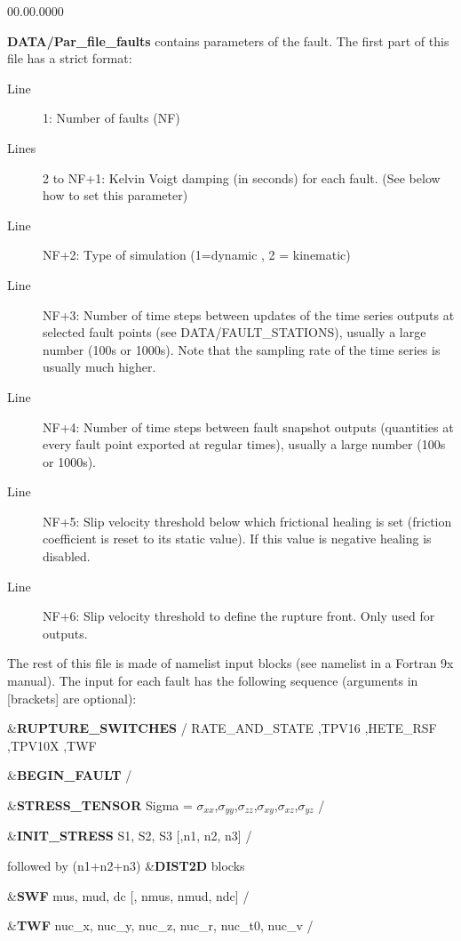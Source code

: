 \begin{lyxlist}{00.00.0000}
\item [{\textbf{DATA/Par\_file\_faults}}] contains parameters of the fault.
The first part of this file has a strict format:

\begin{description}
\item [{Line}] 1: Number of faults (NF)
\item [{Lines}] 2 to NF+1: Kelvin Voigt damping (in seconds) for each fault.
(See below how to set this parameter)
\item [{Line}] NF+2: Type of simulation (1=dynamic , 2 = kinematic)
\item [{Line}] NF+3: Number of time steps between updates of the time series
outputs at selected fault points (see DATA/FAULT\_STATIONS), usually
a large number (100s or 1000s). Note that the sampling rate of the
time series is usually much higher.
\item [{Line}] NF+4: Number of time steps between fault snapshot outputs
(quantities at every fault point exported at regular times), usually
a large number (100s or 1000s).
\item [{Line}] NF+5: Slip velocity threshold below which frictional healing
is set (friction coefficient is reset to its static value). If this
value is negative healing is disabled.
\item [{Line}] NF+6: Slip velocity threshold to define the rupture front.
Only used for outputs.
\end{description}

The rest of this file is made of namelist input blocks (see \textquotedbl{}namelist\textquotedbl{}
in a Fortran 9x manual). The input for each fault has the following
sequence (arguments in {[}brackets{]} are optional):

\&\textbf{RUPTURE\_SWITCHES}  /
RATE\_AND\_STATE ,TPV16 ,HETE\_RSF ,TPV10X ,TWF

\&\textbf{BEGIN\_FAULT} /

\&\textbf{STRESS\_TENSOR} Sigma = $\sigma_{xx}$,$\sigma_{yy}$,$\sigma_{zz}$,$\sigma_{xy}$,$\sigma_{xz}$,$\sigma_{yz}$ /



\&\textbf{INIT\_STRESS} S1, S2, S3 {[},n1, n2, n3{]} /


followed by (n1+n2+n3) \&\textbf{DIST2D} blocks


\&\textbf{SWF} mus, mud, dc {[}, nmus, nmud, ndc{]} /

\&\textbf{TWF} nuc\_x, nuc\_y, nuc\_z, nuc\_r, nuc\_t0, nuc\_v /


\end{lyxlist}
